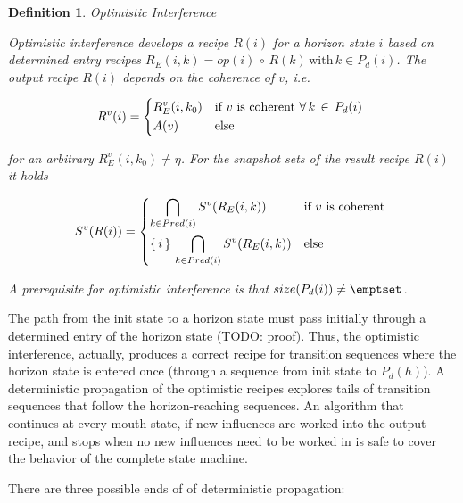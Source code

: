 \documentclass[12pt,a4paper]{scrartcl}
\newtheorem{definition}{Definition}
\begin{document}
\begin{definition} Optimistic Interference

    Optimistic interference develops a recipe $R(i)$ for a horizon state $i$
    based on determined entry recipes $R_E(i,k) =
    op(i)\,\circ\,R(k)\,\mbox{with}\,k \in P_d(i)$.  The output recipe $R(i)$
    depends on the coherence of $v$, i.e. 

    \begin{equation} \label{eq:opt-interference-output}
        R^v(i) = 
        \begin{dcases*}
            R_E^v(i,k_0) & if $v$ is coherent $\forall\,k\,\in\,P_d(i)$ \\
            A(v)         & else
        \end{dcases*}
    \end{equation}

    for an arbitrary $R_E^v(i,k_0)\neq\eta$. For the snapshot sets of the
    result recipe $R(i)$ it holds

    \begin{equation} \label{eq:interference-snapshot-sets}
        S^v(R(i)) = 
        \begin{dcases*}
            \bigcap_{k\in Pred(i)} S^v(R_E(i,k))            & if $v$ is coherent \\
            \{\,i\,\}\,\bigcap_{k\in Pred(i)} S^v(R_E(i,k)) & else \\
        \end{dcases*}
    \end{equation}

    A prerequisite for optimistic interference is that 
    $size(P_d(i)) \neq \emptset$.

\end{definition}

The path from the init state to a horizon state must pass initially through a
determined entry of the horizon state (TODO: proof). Thus, the optimistic
interference, actually, produces a correct recipe for transition sequences
where the horizon state is entered once (through a sequence from init state to
$P_d(h)$). A deterministic propagation of the optimistic recipes explores tails
of transition sequences that follow the horizon-reaching sequences. An algorithm
that continues at every mouth state, if new influences are worked into the 
output recipe, and stops when no new influences need to be worked in is safe
to cover the behavior of the complete state machine. 

There are three possible ends of of deterministic propagation:
\end{document}
